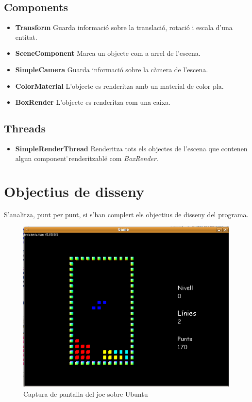     \subsection{Components}

      \begin{itemize}
        \item {\bf Transform}
          Guarda informació sobre la translació, rotació i escala d'una entitat.
          
        \item {\bf SceneComponent}
          Marca un objecte com a arrel de l'escena.
          
        \item {\bf SimpleCamera}
          Guarda informació sobre la càmera de l'escena.
          
        \item {\bf ColorMaterial}
          L'objecte es renderitza amb un material de color pla.
          
        \item {\bf BoxRender}
          L'objecte es renderitza com una caixa.
          
      \end{itemize}
      
    \subsection{Threads}
    
      \begin{itemize}
        \item {\bf SimpleRenderThread}
          Renderitza tots els objectes de l'escena que contenen algun component \"{}renderitzable\"{} com {\em BoxRender}.
          
      \end{itemize}
      
\section{Objectius de disseny}

  S'analitza, punt per punt, si s'han complert els objectius de disseny del programa.
    
  \begin{figure}
    \centering
    \includegraphics[width=0.5\linewidth]{./img/ImatgeUbuntu.png}
    \caption{Captura de pantalla del joc sobre Ubuntu \label{fig:ImatgeUbuntu}}
  \end{figure}

